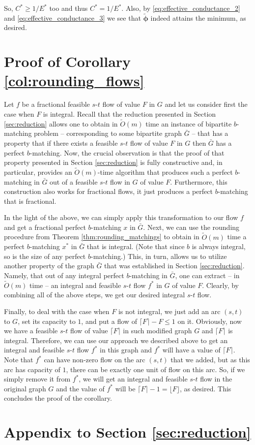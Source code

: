 \documentclass[11pt, letterpaper]{article}
\newcommand{\ceil}[1]{\lceil #1 \rceil}
\newcommand{\floor}[1]{\lfloor #1 \rfloor}
\newcommand{\tO}[1]{\widetilde{O}(#1)}
\newcommand{\oG}{\bar{G}}
\newcommand{\tvphi}{\boldsymbol{\tilde{\phi}}}
\newcommand{\bb}{\boldsymbol{\mathit{b}}}
\newcommand{\ff}{\boldsymbol{\mathit{f}}}
\newcommand{\xx}{\boldsymbol{\mathit{x}}}
\begin{document}
So, $C^*\geq 1/E^*$ too and thus $C^*=1/E^*$. Also, by \eqref{eq:effective_conductance_2} and \eqref{eq:effective_conductance_3} we see that $\tvphi$ indeed attains the minimum, as desired.

\section{Proof of Corollary \ref{col:rounding_flows}}\label{app:col_rounding_flows}

Let $\ff$ be a fractional feasible $s$-$t$ flow of value $F$ in $G$ and let us consider first the case when $F$ is integral. Recall that the reduction presented in Section \ref{sec:reduction} allows one to obtain in $\tO{m}$ time an instance of bipartite $\bb$-matching problem -- corresponding to some bipartite graph $\oG$ -- that has a property that if there exists a feasible $s$-$t$ flow of value $F$ in $G$ then $\oG$ has a perfect $\bb$-matching. Now, the crucial observation is that the proof of that property presented in Section \ref{sec:reduction} is fully constructive and, in particular, provides an $\tO{m}$-time algorithm that produces such a perfect $\bb$-matching in $\oG$ out of a feasible $s$-$t$ flow in $G$ of value $F$. Furthermore, this construction also works for fractional flows, it just produces a perfect $\bb$-matching that is fractional. 

In the light of the above, we can simply apply this transformation to our flow $\ff$ and get a fractional perfect $\bb$-matching $\xx$ in $\oG$. Next, we can use the rounding procedure from Theorem \ref{thm:rounding_matchings} to obtain in $\tO{m}$ time a perfect $\bb$-matching $\xx^*$ in $\oG$ that is integral. (Note that since $\bb$ is always integral, so is the size of any perfect $\bb$-matching.) This, in turn, allows us to utilize another property of the graph $\oG$ that was established in Section \ref{sec:reduction}. Namely, that out of any integral perfect $\bb$-matching in $\oG$, one can extract -- in $\tO{m}$ time -- an integral and feasible $s$-$t$ flow $\ff^*$ in $G$ of value $F$. Clearly, by combining all of the above steps, we get our desired integral $s$-$t$ flow. 

Finally, to deal with the case when $F$ is not integral, we just add an arc $(s,t)$ to $G$, set its capacity to $1$, and put a flow of $\ceil{F}-F\leq 1$ on it. Obviously, now we have a feasible $s$-$t$ flow of value $\ceil{F}$ in such modified graph $G$ and $\ceil{F}$ is integral. Therefore, we can use our approach we described above to get an integral and feasible $s$-$t$ flow $\ff^*$ in this graph and $\ff^*$ will have a value of $\ceil{F}$. Note that $\ff^*$ can have non-zero flow on the arc $(s,t)$ that we added, but as this arc has capacity of $1$, there can be exactly one unit of flow on this arc. So, if we simply remove it from $\ff^*$, we will get an integral and feasible $s$-$t$ flow in the original graph $G$ and the value of $\ff^*$ will be $\ceil{F}-1=\floor{F}$, as desired. This concludes the proof of the corollary. \section{Appendix to Section \ref{sec:reduction}}\label{app:reduction}
\end{document}
